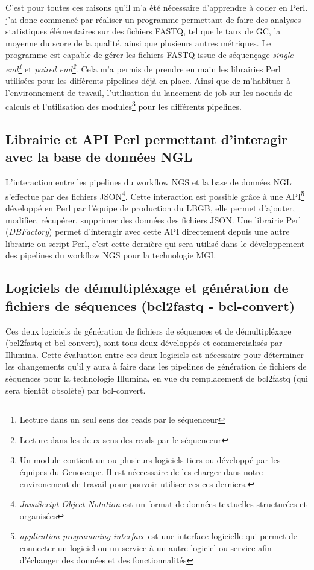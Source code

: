 C'est pour toutes ces raisons qu'il m'a été nécessaire d'apprendre à coder en Perl. j'ai donc commencé par réaliser un programme permettant de faire des analyses statistiques élémentaires sur des fichiers FASTQ, tel que le taux de GC, la moyenne du score de la qualité, ainsi que plusieurs autres métriques. Le programme est capable de gérer les fichiers FASTQ issue de séquençage \emph{single end\footnote{Lecture dans un seul sens des reads par le séquenceur}} et \emph{paired end\footnote{Lecture dans les deux sens des reads par le séquenceur}}. Cela m'a permis de prendre en main les librairies Perl utilisées pour les différents pipelines déjà en place. Ainsi que de m'habituer à l'environnement de travail, l'utilisation du lancement de job sur les noeuds de calculs et l'utilisation des modules\footnote{Un module contient un ou plusieurs logiciels tiers ou développé par les équipes du Genoscope. Il est néccessaire de les charger dans notre environement de travail pour pouvoir utiliser ces ces derniers.} pour les différents pipelines.

\subsection{Librairie et API Perl permettant d'interagir avec la base de données NGL}
L'interaction entre les pipelines du workflow NGS et la base de données NGL s'effectue par des fichiers JSON\footnote{\emph{JavaScript Object Notation} est un format de données textuelles structurées et organisées}.
Cette interaction est possible grâce à une API\footnote{\emph{application programming interface} est une interface logicielle qui permet de \og connecter \fg{} un logiciel ou un service à un autre logiciel ou service afin d'échanger des données et des fonctionnalités} développé en Perl par l'équipe de \og production\fg{} du LBGB, elle permet d'ajouter, modifier, récupérer, supprimer des données des fichiers JSON. Une librairie Perl (\emph{DBFactory}) permet d'interagir avec cette API directement depuis une autre librairie ou script Perl, c'est cette dernière qui sera utilisé dans le développement des pipelines du workflow NGS pour la technologie MGI.

\subsection{Logiciels de démultipléxage et génération de fichiers de séquences (bcl2fastq - bcl-convert)}
\label{DBFactory}
Ces deux logiciels de génération de fichiers de séquences et de démultipléxage (bcl2fastq et bcl-convert), sont tous deux développés et commercialisés par Illumina. Cette évaluation entre ces deux logiciels est nécessaire pour déterminer les changements qu'il y aura à faire dans les pipelines de génération de fichiers de séquences pour la technologie Illumina, en vue du remplacement de bcl2fastq (qui sera bientôt obsolète) par bcl-convert.

